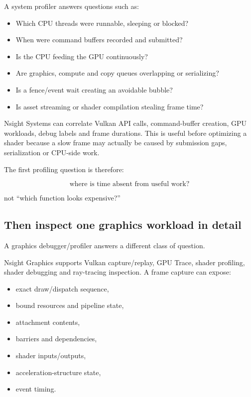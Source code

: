 A system profiler answers questions such as:

\begin{itemize}
\tightlist
\item
  Which CPU threads were runnable, sleeping or blocked?
\item
  When were command buffers recorded and submitted?
\item
  Is the CPU feeding the GPU continuously?
\item
  Are graphics, compute and copy queues overlapping or serializing?
\item
  Is a fence/event wait creating an avoidable bubble?
\item
  Is asset streaming or shader compilation stealing frame time?
\end{itemize}

Nsight Systems can correlate Vulkan API calls, command-buffer creation, GPU workloads, debug labels and frame durations. This is useful before optimizing a shader because a slow frame may actually be caused by submission gaps, serialization or CPU-side work.

The first profiling question is therefore:

\[
\boxed{
\text{where is time absent from useful work?}
}
\]

not ``which function looks expensive?''

\subsection{Then inspect one graphics workload in detail}\label{05-engine-i-ch008-then-inspect-one-graphics-workload-in-detail}

A graphics debugger/profiler answers a different class of question.

Nsight Graphics supports Vulkan capture/replay, GPU Trace, shader profiling, shader debugging and ray-tracing inspection. A frame capture can expose:

\begin{itemize}
\tightlist
\item
  exact draw/dispatch sequence,
\item
  bound resources and pipeline state,
\item
  attachment contents,
\item
  barriers and dependencies,
\item
  shader inputs/outputs,
\item
  acceleration-structure state,
\item
  event timing.
\end{itemize}

